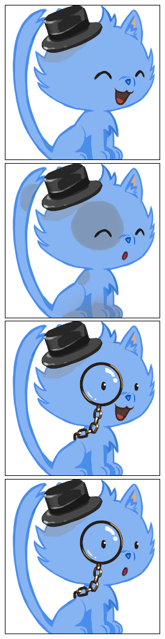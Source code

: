 \documentclass[a4paper, 12pt]{article}
\begin{document}
  \includegraphics[scale=0.45]{out/75.png}
  \includegraphics[scale=0.45]{out/96.png}
  \includegraphics[scale=0.45]{out/81.png}
  \includegraphics[scale=0.45]{out/84.png}
\end{document}
